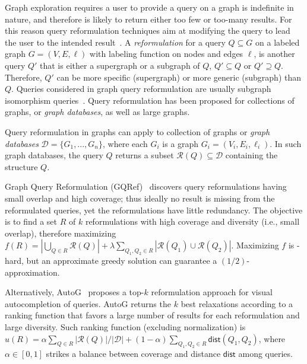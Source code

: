 


\noindent Graph exploration requires a user to provide a query on a graph is indefinite in nature, and therefore is likely to return either too few or too-many results. 
For this reason query reformulation techniques aim at modifying the query to lead the user to the intended result~\citep{mottin2015graph,hurtado2008query,islam2015efficient}. 
A \emph{reformulation} for a query $Q \subseteq G$ on a labeled graph $G = (V, E, \ell)$ with labeling function on nodes and edges $\ell$, is another query $Q'$ that is either a supergraph or a subgraph of $Q$, $Q' \subseteq Q$ or $Q' \supseteq Q$. Therefore, $Q'$ can be more specific (supergraph) or more generic (subgraph) than $Q$. 
Queries considered in graph query reformulation are usually subgraph isomorphism queries~\cite{lee2012depth}.  
Query reformulation has been proposed for collections of graphs, or \emph{graph databases}, as well as large graphs. 

Query reformulation in graphs can apply to collection of graphs or \emph{graph databases} $\mathcal{D} = \{G_1, ..., G_n\}$, where each $G_i$ is a graph $G_i = (V_i, E_i, \ell_i)$. 
In such graph databases, the query $Q$ returns a subset $\mathcal{R}(Q) \subseteq \mathcal{D}$ containing the structure $Q$. 

Graph Query Reformulation (GQRef)~\citep{mottin2015graph} discovers query reformulations having small overlap and high coverage; thus ideally no result is missing from the reformulated queries, yet the reformulations have little redundancy. 
The objective is to find a set $R$ of $k$ reformulations with high coverage and diversity (i.e., small overlap), therefore maximizing $f(R) = |\bigcup_{Q \in R}\mathcal{R}(Q)|+ \lambda\sum_{Q_1,Q_2 \in R}|\mathcal{R}(Q_1) \cup \mathcal{R}(Q_2)|$. 
Maximizing $f$ is \NP-hard, but an approximate greedy solution can guarantee a $(1/2)$-approximation. 

Alternatively, AutoG~\citep{yi2017autog} proposes a top-$k$ reformulation approach for visual autocompletion of queries. 
AutoG returns the $k$ best relaxations according to a ranking function that favors a large number of results for each reformulation and large diversity. 
Such ranking function (excluding normalization) is $u(R) = \alpha \sum_{Q \in R}|\mathcal{R}(Q)|/|\mathcal{D}| + (1-\alpha) \sum_{Q_1, Q_2 \in R} \mathsf{dist}(Q_1, Q_2)$, where  $\alpha \in [0,1]$ strikes a balance between coverage and distance $\mathsf{dist}$ among queries.



